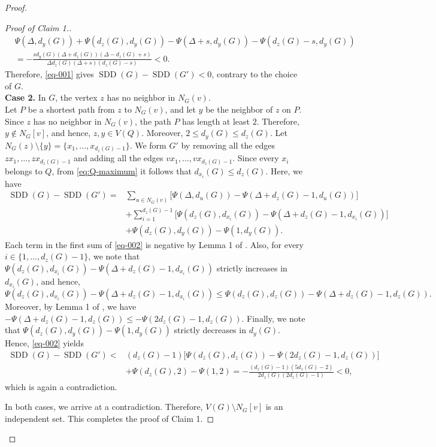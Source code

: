 \documentclass[10pt,a4paper]{amsart}
\newcommand{\SDD}{\operatorname{SDD}}
\begin{document}
\begin{proof}
\begin{proof}[Proof of Claim 1.]
\begin{align*}
&\Psi(\Delta,d_y(G))+\Psi(d_z(G),d_y(G))-\Psi(\Delta+s,d_y(G))
       -\Psi(d_z(G)-s,d_y(G))\\
&= -\frac{s d_y(G)(\Delta+d_z(G))(\Delta-d_z(G)+s)}
 {\Delta d_z(G)(\Delta+s)(d_z(G)-s)}<0.
\end{align*}
Therefore,
\eqref{eq-001} gives
$\SDD(G)-\SDD(G')<0$, contrary to the choice of $G$.\\[2mm]
{\bf Case 2.}
In $G$, the vertex $z$ has no neighbor in $N_G(v)$.\\
Let $P$ be a shortest path from $z$ to $N_G(v)$, and let $y$ be the
neighbor of $z$ on $P$. Since $z$ has no neighbor in $N_G(v)$, the path
$P$ has length at least $2$. Therefore, $y\notin N_G[v]$, and hence, $z,y\in V(Q)$. Moreover, $2\le d_y(G)\le d_z(G)$. Let
$N_G(z)\setminus\{y\}=\{x_1,\ldots,x_{d_z(G)-1}\}$. We form $G'$ by
removing all the edges $zx_1,\ldots,zx_{d_z(G)-1}$ and adding all the edges $vx_1,\ldots,vx_{d_z(G)-1}$.
Since every $x_i$ belongs to $Q$, from
\eqref{eq:Q-maximum} it follows that $d_{x_i}(G)\le d_z(G)$. Here, we have
\begin{align}\label{eq-002}
\SDD(G)-\SDD(G')
={}&\sum_{u\in N_G(v)}
 \bigl[\Psi(\Delta,d_u(G))
       -\Psi(\Delta+d_z(G)-1,d_u(G))\big]\nonumber\\
&+\sum_{i=1}^{d_z(G)-1}
 \bigl[\Psi(d_z(G),d_{x_i}(G))
       -\Psi(\Delta+d_z(G)-1,d_{x_i}(G))\big]\nonumber\\
&+\Psi(d_z(G),d_y(G))-\Psi(1,d_y(G)).
\end{align}
Each term in the first sum of \eqref{eq-002} is negative by Lemma 1 of \cite{AlbalahiAli2022}. Also, for every $i\in\{1,\dots,d_z(G)-1\}$, we note that $\Psi(d_z(G),d_{x_i}(G))
       -\Psi(\Delta+d_z(G)-1,d_{x_i}(G))$ strictly increases in $d_{x_i}(G)$, and hence,
       $$\Psi(d_z(G),d_{x_i}(G))
       -\Psi(\Delta+d_z(G)-1,d_{x_i}(G)) \le \Psi(d_z(G),d_{z}(G))
       -\Psi(\Delta+d_z(G)-1,d_{z}(G)).$$
       Moreover, by Lemma 1 of \cite{AlbalahiAli2022}, we have $-\Psi(\Delta+d_z(G)-1,d_{z}(G))\le-\Psi(2d_z(G)-1,d_{z}(G))$.
        Finally, we note that $\Psi(d_z(G),d_y(G))-\Psi(1,d_y(G))$ strictly decreases in $d_y(G)$. Hence, \eqref{eq-002} yields
\begin{align*}
\SDD(G)-\SDD(G')
<{}&(d_z(G)-1)
 \bigl[\Psi(d_z(G),d_{z}(G))
-\Psi(2d_z(G)-1,d_{z}(G))\big]\\
&+\Psi(d_z(G),2)-\Psi(1,2)=-\frac{(d_z(G)-1)(5d_z(G)-2)}{2d_z(G)(2d_z(G)-1)}<0,
\end{align*}
which is again a contradiction.


 In both cases, we arrive at a contradiction. Therefore, $V(G)\setminus N_G[v]$ is an independent set. This completes the proof of Claim 1.
\end{proof}



\end{proof}
\end{document}
